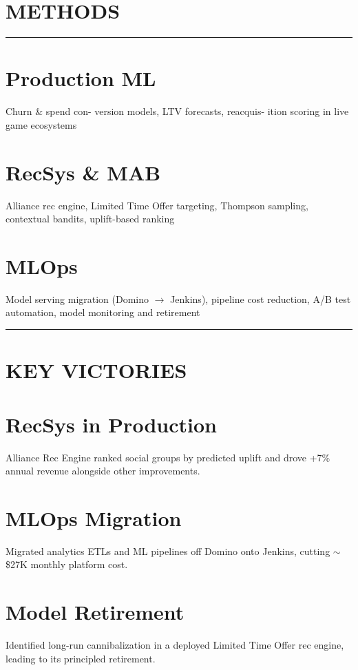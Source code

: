 %

\section{METHODS}
\vspace{-0.1cm}%
\noindent\rule{\textwidth}{0.4pt}
\vspace{-0.1cm}%
%
\section{\large Production ML}
Churn \& spend con- version models, LTV forecasts, reacquis- ition scoring in live game ecosystems
~
\section{\large RecSys \& MAB}
Alliance rec engine, Limited Time Offer targeting, Thompson sampling, contextual bandits, uplift-based ranking
~
\section{\large MLOps}
Model serving migration (Domino $\to$ Jenkins), pipeline cost reduction, A/B test automation, model monitoring and retirement
%
\noindent\rule{\textwidth}{0.4pt}%
\vspace{-0.1cm}%
%
\section{KEY VICTORIES}
\vspace{-0.25cm}
%
\section{\large \faGem RecSys in Production}
Alliance Rec Engine ranked social groups by predicted uplift and drove +7\% annual revenue alongside other improvements.
%
\section{\large \faGem MLOps Migration}
Migrated analytics ETLs and ML pipelines off Domino onto Jenkins, cutting $\sim$\$27K monthly platform cost.
%
\section{\large \faGem Model Retirement}
Identified long-run cannibalization in a deployed Limited Time Offer rec engine, leading to its principled retirement.
